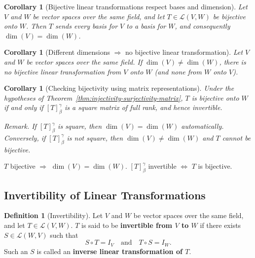 \documentclass[11pt, a4paper, notitlepage]{report}
\newtheorem{corollary}[theorem]{Corollary}
\theoremstyle{definition}
\newtheorem{definition}[theorem]{Definition}
\theoremstyle{remark}
\begin{document}
\begin{corollary}[Bijective linear transformations respect bases and dimension]
\label{cor:bijective-bases-dim}
Let $V$ and $W$ be vector spaces over the same field, and let $T \in \mathcal{L}(V,W)$ be
bijective onto $W$.  Then $T$ sends every basis for $V$ to a basis for $W$, and consequently
$\dim(V) = \dim(W)$.
\end{corollary}

\begin{corollary}[Different dimensions $\Rightarrow$ no bijective linear transformation]
\label{cor:diff-dim-no-bijection}
Let $V$ and $W$ be vector spaces over the same field.  If $\dim(V) \neq \dim(W)$, there is no
bijective linear transformation from $V$ onto $W$ (and none from $W$ onto $V$).
\end{corollary}

\begin{corollary}[Checking bijectivity using matrix representations]
\label{cor:bijective-matrix}
Under the hypotheses of Theorem~\ref{thm:injectivity-surjectivity-matrix}, $T$ is bijective
onto $W$ if and only if $[T]_\beta^\gamma$ is a square matrix of full rank, and hence
invertible.

\emph{Remark.} If $[T]_\beta^\gamma$ is square, then $\dim(V) = \dim(W)$ automatically.
Conversely, if $[T]_\beta^\gamma$ is not square, then $\dim(V) \neq \dim(W)$ and $T$ cannot
be bijective.
\end{corollary}

\begin{keyresult}[title={Key Result: Bijective Linear Transformations Preserve Dimension}]
$T$ bijective $\Rightarrow$ $\dim(V) = \dim(W)$.
$[T]_\beta^\gamma$ invertible $\iff$ $T$ is bijective.
\end{keyresult}

\subsection{Invertibility of Linear Transformations}

\begin{definition}[Invertibility]
\label{def:invertible-lt}
Let $V$ and $W$ be vector spaces over the same field, and let $T \in \mathcal{L}(V,W)$.  $T$
is said to be \textbf{invertible from $V$ to $W$} if there exists $S \in \mathcal{L}(W,V)$
such that
\[
  S \circ T = I_V \quad\text{and}\quad T \circ S = I_W.
\]
Such an $S$ is called an \textbf{inverse linear transformation of $T$}.
\end{definition}
\end{document}
